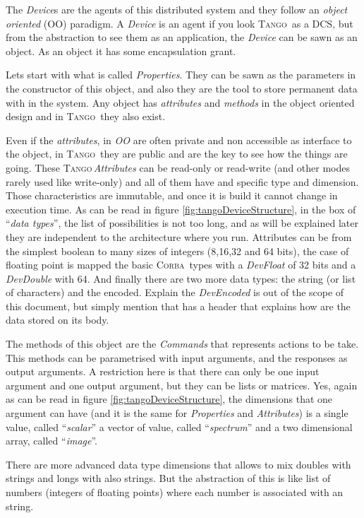 \documentclass[10pt,a4paper,twoside]{llncs}
\newcommand{\tango}{\textsc{Tango}}
\newcommand{\corba}{\textsc{Corba}}
\begin{document}
The \emph{Device}s are the agents of this distributed system and they follow an \emph{object oriented} (OO) paradigm. A \emph{Device} is an agent if you look \tango\, as a DCS, but from the abstraction to see them as an application, the \emph{Device} can be sawn as an object. As an object it has some encapsulation grant.

Lets start with what is called \emph{Properties}. They can be sawn as the parameters in the constructor of this object, and also they are the tool to store permanent data with in the system. Any object has \emph{attributes} and \emph{methods} in the object oriented design and in \tango\, they also exist.

Even if the \emph{attributes}, in \emph{OO} are often private and non accessible as interface to the object, in \tango\, they are public and are the key to see how the things are going. These \tango\,\emph{Attributes} can be read-only or read-write (and other modes rarely used like write-only) and all of them have and specific type and dimension. Those characteristics are immutable, and once it is build it cannot change in execution time. As can be read in figure \ref{fig:tangoDeviceStructure}, in the box of ``\emph{data types}'', the list of possibilities is not too long, and as will be explained later they are independent to the architecture where you run. Attributes can be from the simplest boolean to many sizes of integers (8,16,32 and 64 bits), the case of floating point is mapped the basic \corba\, types with a \emph{DevFloat} of 32 bits and a \emph{DevDouble} with 64. And finally there are two more data types: the string (or list of characters) and the encoded. Explain the \emph{DevEncoded} is out of 
the scope of this document, but simply mention that has a header that explains how are the data stored on its body.

The methods of this object are the \emph{Commands} that represents actions to be take. This methods can be parametrised with input arguments, and the responses as output arguments. A restriction here is that there can only be one input argument and one output argument, but they can be lists or matrices. Yes, again as can be read in figure \ref{fig:tangoDeviceStructure}, the dimensions that one argument can have (and it is the same for \emph{Properties} and \emph{Attributes}) is a single value, called ``\emph{scalar}'' a vector of value, called ``\emph{spectrum}'' and a two dimensional array, called ``\emph{image}''.

There are more advanced data type dimensions that allows to mix doubles with strings and longs with also strings. But the abstraction of this is like list of numbers (integers of floating points) where each number is associated with an string. 
\end{document}
